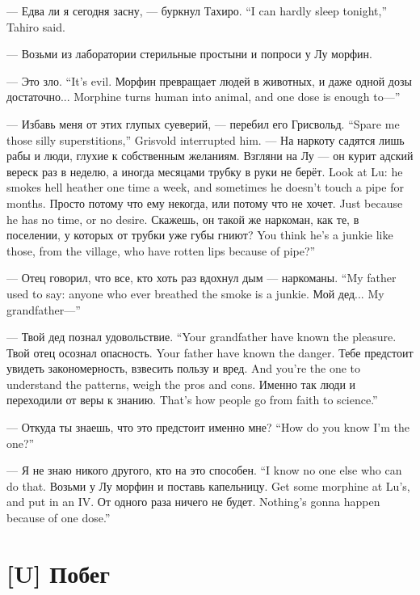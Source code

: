 {--- Едва ли я сегодня засну, --- буркнул Тахиро.}
{``I can hardly sleep tonight,'' Tahiro said.}

--- Возьми из лаборатории стерильные простыни и попроси у Лу морфин.

{--- Это зло.}
{``It's evil.}
{Морфин превращает людей в животных, и даже одной дозы достаточно...}
{Morphine turns human into animal, and one dose is enough to---''}

{--- Избавь меня от этих глупых суеверий, --- перебил его Грисвольд.}
{``Spare me those silly superstitions,'' Grisvold interrupted him.}
--- На наркоту садятся лишь рабы и люди, глухие к собственным желаниям.
{Взгляни на Лу --- он курит адский вереск раз в неделю, а иногда месяцами трубку в руки не берёт.}
{Look at Lu: he smokes hell heather one time a week, and sometimes he doesn't touch a pipe for months.}
{Просто потому что ему некогда, или потому что не хочет.}
{Just because he has no time, or no desire.}
{Скажешь, он такой же наркоман, как те, в поселении, у которых от трубки уже губы гниют?}
{You think he's a junkie like those, from the village, who have rotten lips because of pipe?''}

{--- Отец говорил, что все, кто хоть раз вдохнул дым --- наркоманы.}
{``My father used to say: anyone who ever breathed the smoke is a junkie.}
{Мой дед...}
{My grandfather---''}

{--- Твой дед познал удовольствие.}
{``Your grandfather have known the pleasure.}
{Твой отец осознал опасность.}
{Your father have known the danger.}
{Тебе предстоит увидеть закономерность, взвесить пользу и вред.}
{And you're the one to understand the patterns, weigh the pros and cons.}
{Именно так люди и переходили от веры к знанию.}
{That's how people go from faith to science.''}

{--- Откуда ты знаешь, что это предстоит именно мне?}
{``How do you know I'm the one?''}

{--- Я не знаю никого другого, кто на это способен.}
{``I know no one else who can do that.}
{Возьми у Лу морфин и поставь капельницу.}
{Get some morphine at Lu's, and put in an IV.}
{От одного раза ничего не будет.}
{Nothing's gonna happen because of one dose.''}

\chapter{[U] Побег}

